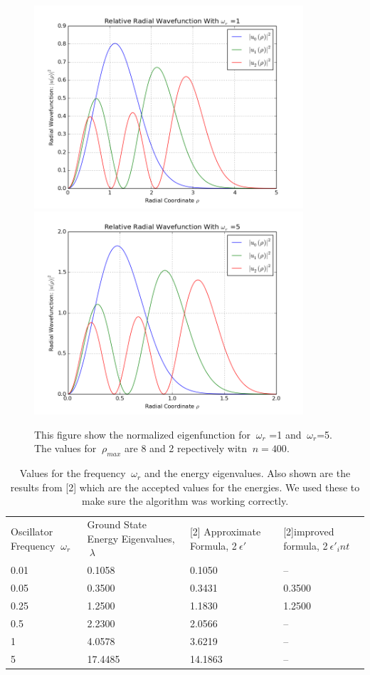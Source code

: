 \documentclass[11pt,a4wide]{article}
\begin{document}
\begin{figure}[H]
\centering
\includegraphics[width=100mm]{I_1.png}
\includegraphics[width=100mm]{I_50.png}
\caption{This figure show the normalized eigenfunction for $\ \omega_r$ =1 and $\ \omega_r$=5. The values for $\ \rho_{max}$ are 8 and 2 repectively witn $\ n=400$. \label{overflow}}
\end{figure}

\begin{table}[H]
\centering
\label{my-label}
\begin{tabular}{| m{3cm} | m{3cm} | m{3cm} | m{3cm} |}
 \cline{1-4}
 Oscillator Frequency $\ \omega_r$&  Ground State Energy Eigenvalues, $\ \lambda$&  [2] Approximate Formula, 2$\ \epsilon'$&  [2]improved formula, 2$\ \epsilon'_int$ \\ \cline{1-4}
 0.01&  0.1058& 0.1050& --\\ \cline{1-4}
 0.05&  0.3500& 0.3431& 0.3500\\ \cline{1-4}
 0.25&  1.2500& 1.1830& 1.2500\\ \cline{1-4}
 0.5&  2.2300&  2.0566& --\\ \cline{1-4}
 1&  4.0578&    3.6219& --\\ \cline{1-4}
 5&  17.4485&   14.1863& --\\ \cline{1-4}
\end{tabular}
\caption{Values for the frequency $\ \omega_r$ and the energy eigenvalues. Also shown are the results from [2] which are the accepted values for the energies. We used these to make sure the algorithm was working correctly.}
\end{table}
\end{document}
